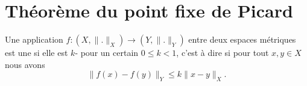 \section{Théorème du point fixe de Picard}

\begin{definition}
    Une application \( f\colon (X,\| . \|_X)\to (Y,\| . \|_Y)\) entre deux espaces métriques est une  si elle est \( k\)- pour un certain \( 0\leq k<1\), c'est à dire si pour tout \( x,y\in X\) nous avons
    \begin{equation}
        \| f(x)-f(y) \|_Y\leq k\| x-y \|_{X}.
    \end{equation}
\end{definition}


